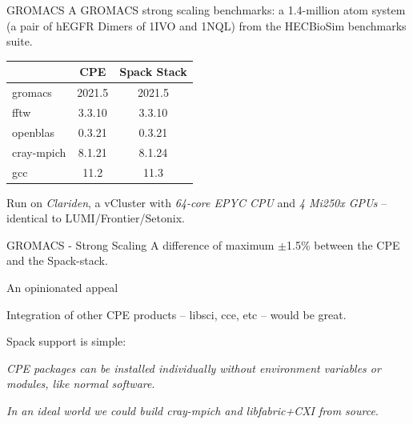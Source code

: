 \documentclass[aspectratio=43]{beamer}
\begin{document}
\begin{frame}[fragile]{GROMACS}
    A GROMACS strong scaling benchmarks: a 1.4-million atom system (a pair of hEGFR Dimers of 1IVO and 1NQL) from the HECBioSim benchmarks suite.
\begin{center}
    \begin{tabular}{|l |c  c| }
        \cline{2-3}
\multicolumn{1}{c|}{} & CPE   & Spack Stack \\
        \hline
        gromacs       & 2021.5   & 2021.5   \\
        fftw          & 3.3.10   & 3.3.10   \\
        openblas      & 0.3.21   & 0.3.21   \\
        cray-mpich    & 8.1.21   & 8.1.24   \\
        gcc           & 11.2     & 11.3     \\
          \hline
    \end{tabular}
\end{center}

    Run on \emph{Clariden}, a vCluster with \emph{64-core EPYC CPU} and  \emph{4 Mi250x GPUs} -- identical to LUMI/Frontier/Setonix.
\end{frame}

\begin{frame}[fragile]{GROMACS - Strong Scaling}
    A difference of maximum $\pm$1.5\% between the CPE and the Spack-stack.
    \begin{center}
        
    \end{center}
\end{frame}


\begin{frame}[fragile]{An opinionated appeal}
    \begin{center}
    Integration of other CPE products -- libsci, cce, etc -- would be great.

    \vspace{20pt}

    Spack support is simple:

    \vspace{20pt}

    \emph{CPE packages can be installed individually without environment variables or modules, like normal software}.

    \vspace{20pt}

    \emph{In an ideal world we could build cray-mpich and libfabric+CXI from source}.
    \end{center}
\end{frame}
\end{document}
